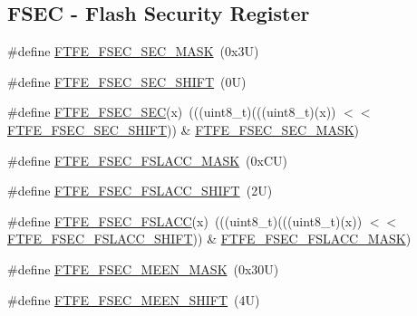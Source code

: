 \subsection*{F\+S\+EC -\/ Flash Security Register}
\begin{DoxyCompactItemize}
\item 
\#define \mbox{\hyperlink{group___f_t_f_e___register___masks_gad3ce37250b2d1b59816d2771ef828f7d}{F\+T\+F\+E\+\_\+\+F\+S\+E\+C\+\_\+\+S\+E\+C\+\_\+\+M\+A\+SK}}~(0x3\+U)
\item 
\#define \mbox{\hyperlink{group___f_t_f_e___register___masks_gabb0120ba7f17b8ba8a56d75322e90596}{F\+T\+F\+E\+\_\+\+F\+S\+E\+C\+\_\+\+S\+E\+C\+\_\+\+S\+H\+I\+FT}}~(0\+U)
\item 
\#define \mbox{\hyperlink{group___f_t_f_e___register___masks_ga40a3d5d921123a3ac7ea4c5a081e5a5e}{F\+T\+F\+E\+\_\+\+F\+S\+E\+C\+\_\+\+S\+EC}}(x)~(((uint8\+\_\+t)(((uint8\+\_\+t)(x)) $<$$<$ \mbox{\hyperlink{group___f_t_f_e___register___masks_gabb0120ba7f17b8ba8a56d75322e90596}{F\+T\+F\+E\+\_\+\+F\+S\+E\+C\+\_\+\+S\+E\+C\+\_\+\+S\+H\+I\+FT}})) \& \mbox{\hyperlink{group___f_t_f_e___register___masks_gad3ce37250b2d1b59816d2771ef828f7d}{F\+T\+F\+E\+\_\+\+F\+S\+E\+C\+\_\+\+S\+E\+C\+\_\+\+M\+A\+SK}})
\item 
\#define \mbox{\hyperlink{group___f_t_f_e___register___masks_gabb6e4b7f5515626f6e19931ee6812e84}{F\+T\+F\+E\+\_\+\+F\+S\+E\+C\+\_\+\+F\+S\+L\+A\+C\+C\+\_\+\+M\+A\+SK}}~(0x\+C\+U)
\item 
\#define \mbox{\hyperlink{group___f_t_f_e___register___masks_ga7e242828689c59247ae5c4e78dbea147}{F\+T\+F\+E\+\_\+\+F\+S\+E\+C\+\_\+\+F\+S\+L\+A\+C\+C\+\_\+\+S\+H\+I\+FT}}~(2\+U)
\item 
\#define \mbox{\hyperlink{group___f_t_f_e___register___masks_ga7fc033cf747e62c1e7f01a2bdd6777ab}{F\+T\+F\+E\+\_\+\+F\+S\+E\+C\+\_\+\+F\+S\+L\+A\+CC}}(x)~(((uint8\+\_\+t)(((uint8\+\_\+t)(x)) $<$$<$ \mbox{\hyperlink{group___f_t_f_e___register___masks_ga7e242828689c59247ae5c4e78dbea147}{F\+T\+F\+E\+\_\+\+F\+S\+E\+C\+\_\+\+F\+S\+L\+A\+C\+C\+\_\+\+S\+H\+I\+FT}})) \& \mbox{\hyperlink{group___f_t_f_e___register___masks_gabb6e4b7f5515626f6e19931ee6812e84}{F\+T\+F\+E\+\_\+\+F\+S\+E\+C\+\_\+\+F\+S\+L\+A\+C\+C\+\_\+\+M\+A\+SK}})
\item 
\#define \mbox{\hyperlink{group___f_t_f_e___register___masks_ga1eb5ff8901b0e60cc847e11e66096931}{F\+T\+F\+E\+\_\+\+F\+S\+E\+C\+\_\+\+M\+E\+E\+N\+\_\+\+M\+A\+SK}}~(0x30\+U)
\item 
\#define \mbox{\hyperlink{group___f_t_f_e___register___masks_gabcb6c110f2c3a61788237eb32991610d}{F\+T\+F\+E\+\_\+\+F\+S\+E\+C\+\_\+\+M\+E\+E\+N\+\_\+\+S\+H\+I\+FT}}~(4\+U)

\end{DoxyCompactItemize}
